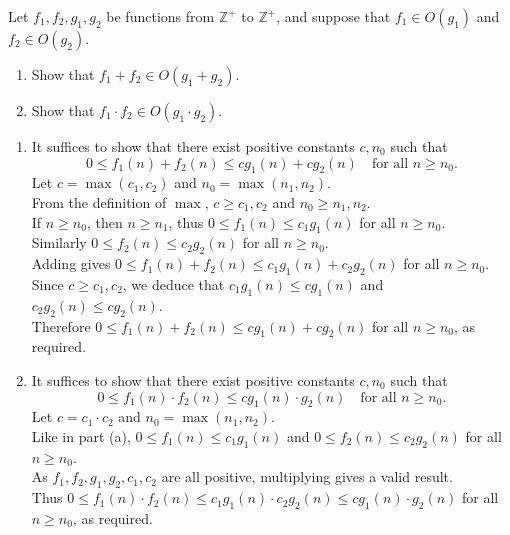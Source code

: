 \documentclass{article}
\begin{document}
\begin{question}
Let $f_1, f_2, g_1, g_2$ be functions from $\mathbb Z^+$ to $\mathbb Z^+$, and suppose that $f_1 \in O(g_1)$ and $f_2 \in O(g_2)$.

\begin{enumerate}[label = (\alph*)]
    \item Show that $f_1 + f_2 \in O(g_1 + g_2)$.
    \item Show that $f_1 \cdot f_2 \in O(g_1 \cdot g_2)$.
\end{enumerate}
\end{question}

\begin{solution}
\begin{enumerate}[label = (\alph*)]
    Since $f_1\in O(g_1)$, there exist positive constants $c_1, n_1$ such that 
    $$0\leq f_1(n)\leq c_1g_1(n)\quad \text{for all } n\geq n_1.$$ 
    Similarly, since $f_2\in O(g_2)$, there exist positive constants $c_2, n_2$ such that 
    $$0\leq f_2(n)\leq c_2g_2(n)\quad \text{for all } n\geq n_2.$$

    \item It suffices to show that there exist positive constants $c, n_0$ such that 
    $$0\leq f_1(n)+f_2(n)\leq cg_1(n)+cg_2(n)\quad \text{for all } n\geq n_0.$$
    Let $c=\max(c_1, c_2)$ and $n_0=\max(n_1, n_2)$. \\
    From the definition of $\max$, $c\geq c_1, c_2$ and $n_0\geq n_1, n_2$. \\
    If $n\geq n_0$, then $n\geq n_1$, thus $0\leq f_1(n) \leq c_1 g_1(n)$ for all $n \geq n_0$.\\
    Similarly $0\leq f_2(n)\leq c_2g_2(n)$ for all $n\geq n_0$.\\
    Adding gives $0\leq f_1(n)+f_2(n)\leq c_1g_1(n) + c_2g_2(n)$ for all $n\geq n_0$.\\
    Since $c\geq c_1, c_2$, we deduce that $c_1g_1(n)\leq cg_1(n)$ and $c_2g_2(n)\leq cg_2(n)$.\\
    Therefore $0\leq f_1(n)+f_2(n)\leq cg_1(n) + cg_2(n)$ for all $n\geq n_0$, as required.

    \item It suffices to show that there exist positive constants $c, n_0$ such that 
    $$0\leq f_1(n)\cdot f_2(n)\leq cg_1(n)\cdot g_2(n)\quad \text{for all } n\geq n_0.$$
    Let $c=c_1 \cdot c_2$ and $n_0=\max(n_1, n_2)$. \\
    Like in part (a), $0\leq f_1(n) \leq c_1 g_1(n)$ and $0\leq f_2(n)\leq c_2g_2(n)$ for all $n\geq n_0$.\\
    As $f_1, f_2, g_1, g_2, c_1, c_2$ are all positive, multiplying gives a valid result.\\
    Thus $0\leq f_1(n)\cdot f_2(n)\leq c_1g_1(n) \cdot c_2g_2(n)\leq cg_1(n)\cdot g_2(n)$ for all $n\geq n_0$, as required.
\end{enumerate}
\end{solution}
\end{document}
